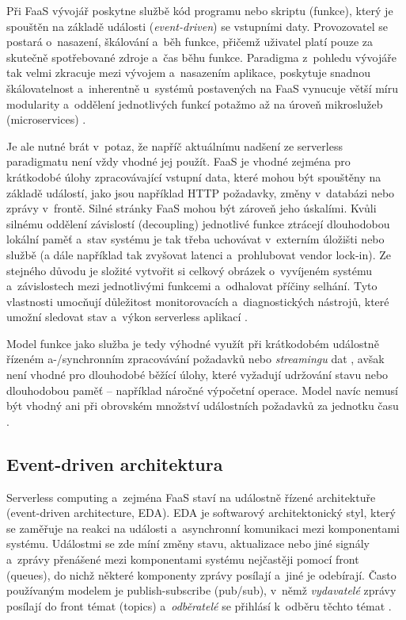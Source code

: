 \documentclass[czech, ing, kiv, he, iso690]{fasthesis}
\begin{document}
Při FaaS vývojář poskytne službě kód programu nebo skriptu (funkce), který je spouštěn na základě události (\emph{event-driven}) se vstupními daty. Provozovatel se postará o~nasazení, škálování a~běh funkce, přičemž uživatel platí pouze za skutečně spotřebované zdroje a~čas běhu funkce. Paradigma z~pohledu vývojáře tak velmi zkracuje  mezi vývojem a~nasazením aplikace, poskytuje snadnou škálovatelnost a~inherentně u~systémů postavených na FaaS vynucuje větší míru modularity a~oddělení jednotlivých funkcí potažmo až na úroveň mikroslužeb (microservices) \cite{designing_distributed_systems}.

Je ale nutné brát v~potaz, že napříč aktuálnímu nadšení ze serverless paradigmatu není vždy vhodné jej použít. FaaS je vhodné zejména pro krátkodobé úlohy zpracovávající vstupní data, které mohou být spouštěny na základě událostí, jako jsou například HTTP požadavky, změny v~databázi nebo zprávy v~frontě. Silné stránky FaaS mohou být zároveň jeho úskalími. Kvůli silnému oddělení závislostí (decoupling) jednotlivé funkce ztrácejí dlouhodobou lokální paměť a~stav systému je tak třeba uchovávat v~externím úložišti nebo službě (a dále například tak zvyšovat latenci a~prohlubovat vendor lock-in). Ze stejného důvodu je složité vytvořit si celkový obrázek o~vyvíjeném systému a~závislostech mezi jednotlivými funkcemi a~odhalovat příčiny selhání. Tyto vlastnosti umocňují důležitost monitorovacích a~diagnostických nástrojů, které umožní sledovat stav a~výkon serverless aplikací \cite{designing_distributed_systems}. 

Model funkce jako služba je tedy výhodné využít při krátkodobém událostně řízeném a-/synchronním zpracovávání požadavků nebo \emph{streamingu} dat \cite{serverless.docs.aws}, avšak není vhodné pro dlouhodobé běžící úlohy, které vyžadují udržování stavu nebo dlouhodobou paměť -- například náročné výpočetní operace. Model navíc nemusí být vhodný ani při obrovském množství událostních požadavků za jednotku času \cite{designing_distributed_systems}. 


\subsection{Event-driven architektura}
Serverless computing a~zejména FaaS staví na událostně řízené architektuře (event-driven architecture, EDA). EDA je softwarový architektonický styl, který se zaměřuje na reakci na události a~asynchronní komunikaci mezi komponentami systému. Událostmi se zde míní změny stavu, aktualizace \cite{serverless.docs.aws} nebo jiné signály a~zprávy přenášené mezi komponentami systému nejčastěji pomocí front (queues), do nichž některé komponenty zprávy posílají a~jiné je odebírají. Často používaným modelem je publish-subscribe (pub/sub), v~němž \emph{vydavatelé} zprávy posílají do front témat (topics) a~\emph{odběratelé} se přihlásí k~odběru těchto témat \cite{designing_distributed_systems, distrib_sys_4}.
\end{document}
